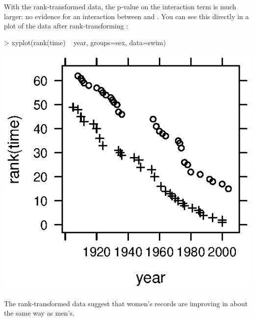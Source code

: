 With the rank-transformed data, the p-value on the interaction term is
much larger: no evidence for an interaction between
 and .  You can see this directly in  a plot of the data
after rank-transforming :

\begin{Schunk}
\begin{Sinput}
> xyplot(rank(time) ~ year, groups=sex, data=swim)
\end{Sinput}
\end{Schunk}
\includegraphics{Figures/traditional-non-param-swim}

The rank-transformed data suggest that women's records are improving
in about the same way as men's.
